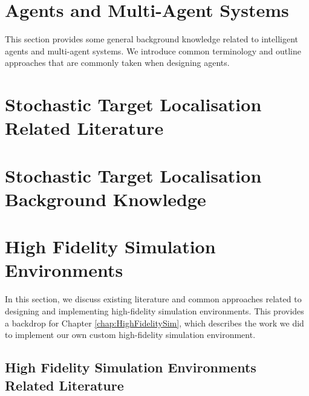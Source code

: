 \section{Agents and Multi-Agent Systems}
This section provides some general background knowledge related to intelligent agents and multi-agent systems. We introduce common terminology and outline approaches that are commonly taken when designing agents.


\section{Stochastic Target Localisation Related Literature}\label{sec:StochasticTargetLocalisationRelatedLiterature}


\section{Stochastic Target Localisation Background Knowledge}\label{sec:StochasticTargetLocalizationBackground}


\section{High Fidelity Simulation Environments}
In this section, we discuss existing literature and common approaches related to designing and implementing high-fidelity simulation environments. This provides a backdrop for Chapter \ref{chap:HighFidelitySim}, which describes the work we did to implement our own custom high-fidelity simulation environment.
\subsection{High Fidelity Simulation Environments Related Literature}\label{sec:SimulationEnvironmentsRelatedLiterature}



%



